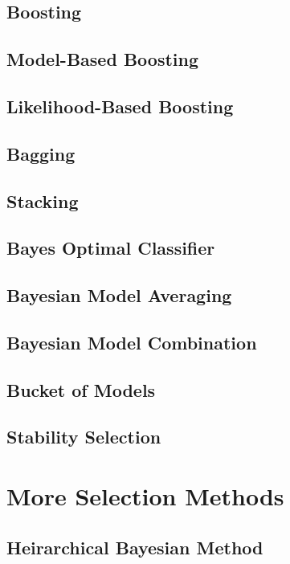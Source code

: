 \subsection{Boosting}
\subsection{Model-Based Boosting}
\subsection{Likelihood-Based Boosting}
\subsection{Bagging}
\subsection{Stacking}
\subsection{Bayes Optimal Classifier}
\subsection{Bayesian Model Averaging}
\subsection{Bayesian Model Combination}
\subsection{Bucket of Models}
\subsection{Stability Selection}

\section{More Selection Methods}

\subsection{Heirarchical Bayesian Method} 


